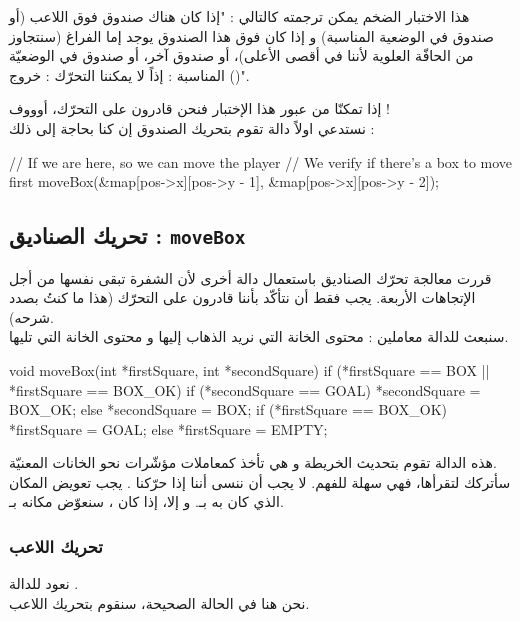 هذا الاختبار الضخم يمكن ترجمته كالتالي : "إذا كان هناك صندوق فوق اللاعب (أو صندوق في الوضعية المناسبة) و إذا كان فوق هذا الصندوق يوجد إما الفراغ (سنتجاوز من الحافّة العلوية لأننا في أقصى الأعلى)، أو صندوق آخر، أو صندوق في الوضعيّة المناسبة : إذاً لا يمكننا التحرّك : خروج
()".

إذا تمكنّا من عبور هذا الإختبار فنحن قادرون على التحرّك، أوووف !\\
نستدعي اولاً دالة تقوم بتحريك الصندوق إن كنا بحاجة إلى ذلك :

\begin{Csource}
// If we are here, so we can move the player
// We verify if there's a box to move first
moveBox(&map[pos->x][pos->y - 1], &map[pos->x][pos->y - 2]);
\end{Csource}

\subsection{تحريك الصناديق : \texttt{moveBox}}

قررت معالجة تحرّك الصناديق باستعمال دالة أخرى لأن الشفرة تبقى نفسها من أجل الإتجاهات الأربعة. يجب فقط أن نتأكّد بأننا قادرون على التحرّك (هذا ما كنتُ بصدد شرحه).\\
سنبعث للدالة معاملين : محتوى الخانة التي نريد الذهاب إليها و محتوى الخانة التي تليها.

\begin{Csource}
void moveBox(int *firstSquare, int *secondSquare)
{
	if (*firstSquare == BOX || *firstSquare == BOX_OK)
	{
		if (*secondSquare == GOAL)
			*secondSquare = BOX_OK;
		else
			*secondSquare = BOX;
		if (*firstSquare == BOX_OK)
			*firstSquare = GOAL;
		else
			*firstSquare = EMPTY;
	}
}
\end{Csource}

هذه الدالة تقوم بتحديث الخريطة و هي تأخذ كمعاملات مؤشّرات نحو الخانات المعنيّة.\\
سأتركك لتقرأها، فهي سهلة للفهم. لا يجب أن ننسى أننا إذا حرّكنا 
.
يجب تعويض المكان الذي كان به بـ.
و إلا، إذا كان
،
 سنعوّض مكانه بـ.

\subsubsection{تحريك اللاعب}

نعود للدالة
.\\
نحن هنا في الحالة الصحيحة، سنقوم بتحريك اللاعب.


